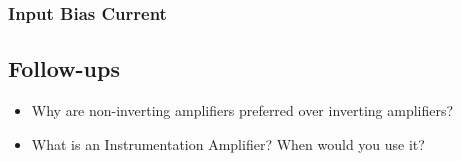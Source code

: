 \documentclass[main.tex]{subfiles}
\begin{document}
\subsubsection{Input Bias Current}

\subsection{Follow-ups}
\begin{itemize}
    \item Why are non-inverting amplifiers preferred over inverting amplifiers? %
    \item What is an Instrumentation Amplifier? When would you use it? %
\end{itemize}
\end{document}
